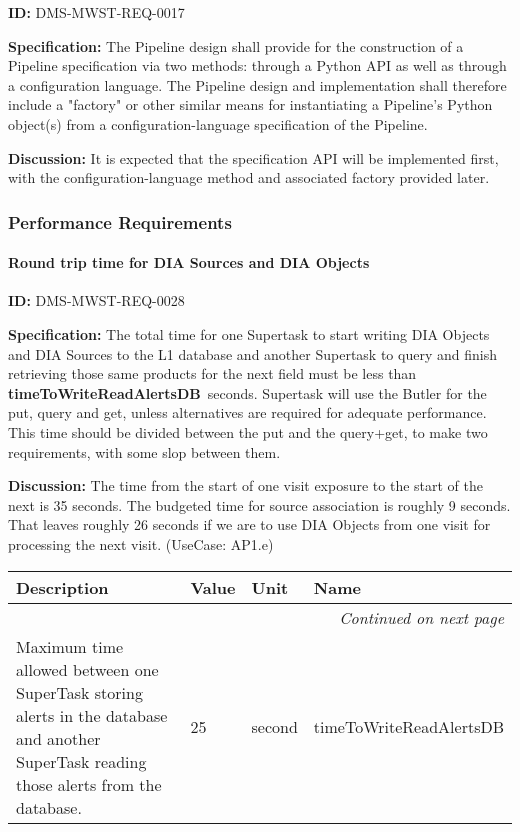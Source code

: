 \documentclass[SE,toc,lsstdraft]{lsstdoc}
\makeatletter
\newcommand{\paramname}[1]{\hspace{0pt}#1}
\newcommand{\unitname}[1]{\hspace{0pt}#1}
\newenvironment{parameters}[0]{%
\setlength\LTleft{0pt}
\setlength\LTright{\fill}
\begin{small}
\begin{longtable}[]{|p{0.49\textwidth}|l|p{0.6in}|p{1.70in}@{}|}

\hline \textbf{Description} & \textbf{Value} & \textbf{Unit} & \textbf{Name} \\ \hline
\endhead

\hline \multicolumn{4}{r}{\emph{Continued on next page}} \\
\endfoot

\hline\hline
\endlastfoot
}{%
\hline
\end{longtable}
\end{small}
}
\makeatother
\begin{document}
\label{DMS-MWST-REQ-0017}
\textbf{ID:} DMS-MWST-REQ-0017

\textbf{Specification:}
The Pipeline design shall provide for the construction of a Pipeline specification via two methods: through a Python API as well as through a configuration language.  The Pipeline design and implementation shall therefore include a "factory" or other similar means for instantiating a Pipeline's Python object(s) from a configuration-language specification of the Pipeline.

\textbf{Discussion:}
It is expected that the specification API will be implemented first, with the configuration-language method and associated factory provided later.

\subsubsection{Performance Requirements}

\paragraph{Round trip time for DIA Sources and DIA Objects}\hfill  %

\label{DMS-MWST-REQ-0028}
\textbf{ID:} DMS-MWST-REQ-0028

\textbf{Specification:}
The total time for one Supertask to start writing DIA Objects and DIA Sources to the L1 database and another Supertask to query and finish retrieving those same products for the next field must be less than \textbf{timeToWriteReadAlertsDB} seconds. Supertask will use the Butler for the put, query and get, unless alternatives are required for adequate performance. This time should be divided between the put and the query+get, to make two requirements, with some slop between them.

\textbf{Discussion:}
The time from the start of one visit exposure to the start of the next is 35 seconds. The budgeted time for source association is roughly 9 seconds. That leaves roughly 26 seconds if we are to use DIA Objects from one visit for processing the next visit. (UseCase: AP1.e)

\begin{parameters}
Maximum time allowed between one SuperTask storing alerts in the database and another SuperTask reading those alerts from the database.
&
25
&
\unitname{%
second
}
&
\paramname{%
timeToWriteReadAlertsDB
} \\\hline
\end{parameters}
\end{document}
